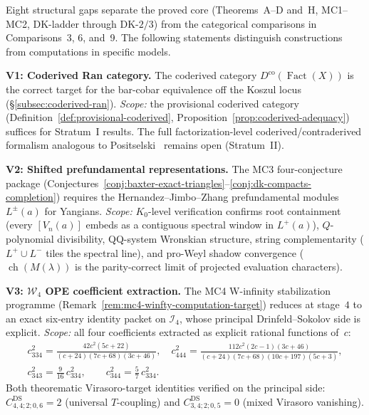 \begin{remark}
\label{rem:structural-gaps-verification}
Eight structural gaps separate the proved core
(Theorems~A--D and~H, MC1--MC2, DK-ladder through DK-$2/3$) from the
categorical comparisons in Comparisons~3, 6, and~9.  The following statements
distinguish constructions from computations in specific models.

\smallskip
\noindent\textbf{V1: Coderived Ran category.}
The coderived category
$D^{\mathrm{co}}(\operatorname{Fact}(X))$ is the correct target for
the bar-cobar equivalence off the Koszul locus
(\S\ref{subsec:coderived-ran}).
\emph{Scope:}
the provisional coderived category
(Definition~\ref{def:provisional-coderived},
Proposition~\ref{prop:coderived-adequacy})
suffices for Stratum~I results.  The full factorization-level
coderived/contraderived formalism analogous to
Positselski~\cite{Positselski11} remains open (Stratum~II).

\smallskip
\noindent\textbf{V2: Shifted prefundamental representations.}
The MC3 four-conjecture package
(Conjectures~\ref{conj:baxter-exact-triangles}--\ref{conj:dk-compacts-completion})
requires the Hernandez--Jimbo--Zhang prefundamental modules
$L^\pm(a)$ for Yangians.
\emph{Scope:}
$K_0$-level verification confirms root containment (every
$[V_n(a)]$ embeds as a contiguous spectral window in $L^+(a)$),
$Q$-polynomial divisibility, QQ-system Wronskian structure, string
complementarity ($L^+ \cup L^-$ tiles the spectral line), and
pro-Weyl shadow convergence ($\operatorname{ch}(M(\lambda))$ is the
parity-correct limit of projected evaluation characters).

\smallskip
\noindent\textbf{V3: $\mathcal{W}_4$ OPE coefficient extraction.}
The MC4 W-infinity stabilization programme
(Remark~\ref{rem:mc4-winfty-computation-target})
reduces at stage~$4$ to an exact six-entry identity packet on
$\mathcal{I}_4$, whose principal Drinfeld--Sokolov side is explicit.
\emph{Scope:}
all four coefficients extracted as explicit rational functions of~$c$:
\begin{gather*}
c_{334}^2 = \frac{42c^2(5c+22)}{(c+24)(7c+68)(3c+46)},
\quad
c_{444}^2 = \frac{112c^2(2c-1)(3c+46)}{(c+24)(7c+68)(10c+197)(5c+3)},
\\
c_{343}^2 = \tfrac{9}{16}\,c_{334}^2,
\qquad
c_{344}^2 = \tfrac{5}{7}\,c_{334}^2.
\end{gather*}
Both theorematic Virasoro-target identities verified on the principal side:
$C^{\mathrm{DS}}_{4,4;2;0,6} = 2$ (universal $T$-coupling) and
$C^{\mathrm{DS}}_{3,4;2;0,5} = 0$ (mixed Virasoro vanishing).


\end{remark}
